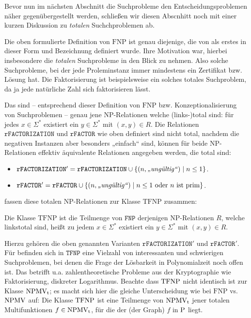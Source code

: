 Bevor nun im nächsten Abschnitt die Suchprobleme den Entscheidungsproblemen näher gegenübergestellt werden, schließen wir diesen Abscnhitt noch mit einer kurzen Diskussion zu \emph{totalen} Suchchproblemen ab.

Die oben formulierte Definition von $\mathrm{FNP}$ ist genau diejenige, die von \textcite{megiddo_total_1991} als erstes in dieser Form und Bezeichnung definiert wurde. Ihre Motivation war, hierbei insbesondere die \emph{totalen} Suchprobleme in den Blick zu nehmen. Also solche Suchprobleme, bei der jede Proleminstanz immer mindestens ein Zertifikat bzw. Lösung hat. Die Faktorisierung ist beispielsweise ein solches totales Suchproblem, da ja jede natürliche Zahl sich faktorisieren lässt.

Das sind -- entsprechend dieser Definition von $\mathrm{FNP}$ bzw. Konzeptionalisierung von Suchproblemen -- genau jene NP-Relationen welche (links-)total sind: für jedes $x\in\Sigma^*$ existiert ein $y\in\Sigma^*$ mit $(x,y)\in R$. 
Die Relationen $\mathtt{rFACTORIZATION}$ und $\mathtt{rFACTOR}$ wie oben definiert sind nicht total, nachdem die negativen Instanzen aber besonders „einfach“ sind, können für beide NP-Relationen effektiv äquivalente Relationen angegeben werden, die total sind:
\begin{itemize} \item $\mathtt{rFACTORIZATION}' = \mathtt{rFACTORIZATION} \cup \{ (n, \text{\emph{„ungültig“}}) \mid n\leq 1 \}$.
    \item $\mathtt{rFACTOR}' = \mathtt{rFACTOR} \cup \{ (n, \text{\emph{„ungültig“}}) \mid n\leq 1 \text{ oder $n$ ist prim} \}$.
\end{itemize}
\textcite{megiddo_total_1991} fassen diese totalen NP-Relationen zur Klasse $\mathrm{TFNP}$ zusammen:
\begin{definition}
    Die Klasse $\mathrm{TFNP}$ ist die Teilmenge von $\mathtt{FNP}$ derjenigen NP-Relationen $R$, welche linkstotal sind, heißt zu jedem $x\in\Sigma^*$ existiert ein $y\in\Sigma^*$ mit $(x,y)\in R$.
\end{definition}
Hierzu gehören die oben genannten Varianten $\mathtt{rFACTORIZATION}'$ und $\mathtt{rFACTOR}'$.
Für \citeauthor{megiddo_total_1991} befinden sich in $\mathtt{TFNP}$ eine Vielzahl von interessanten und schwierigen Suchproblemen, bei denen die Frage der Lösbarkeit in Polynomialzeit noch offen ist.
Das betrifft u.a. zahlentheoretische Probleme aus der Kryptographie wie Faktorisierung, diskreter Logarithmus. Beachte dass $\TFNP$ nicht identisch ist zur Klasse $\NPMVt$; es macht sich hier die gleiche Unterscheidung wie bei $\mathrm{FNP}$ vs. $\NPMV$ auf: Die Klasse $\TFNP$ ist eine Teilmenge von $\NPMVt$ jener totalen Multifunktionen $f\in\NPMVt$, für die der (der Graph) $f$ in $\P$ liegt.
